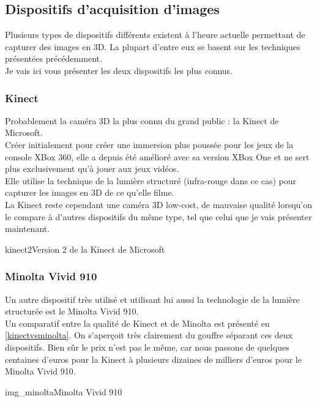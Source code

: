 \documentclass[poster]{polytech/polytech}
\begin{document}
\subsection{Dispositifs d'acquisition d'images}
\label{dispositif_acquisiton}
Plusieurs types de dispositifs différents existent à l'heure actuelle permettant de capturer des images en 3D. La plupart d'entre eux se basent sur les techniques présentées précédemment.\\
Je vais ici vous présenter les deux dispositifs les plus connus.

\subsubsection{Kinect}
\label{kinect}
Probablement la caméra 3D la plus connu du grand public : la Kinect de Microsoft.\\
Créer initialement pour créer une immersion plus poussée pour les jeux de la console XBox 360, elle a depuis été amélioré avec sa version XBox One et ne sert plus exclusivement qu'à jouer aux jeux vidéos.\\
Elle utilise la technique de la lumière structuré (infra-rouge dans ce cas) pour capturer les images en 3D de ce qu'elle filme.\\
La Kinect reste cependant une caméra 3D low-cost, de mauvaise qualité lorsqu'on le compare à d'autres dispositifs du même type, tel que celui que je vais présenter maintenant.

\begin{Figure}{kinect2}{Version 2 de la Kinect de Microsoft}
\end{Figure}

\subsubsection{Minolta Vivid 910}
\label{minolta}
Un autre dispositif très utilisé et utilisant lui aussi la technologie de la lumière structurée est le Minolta Vivid 910.\\
Un comparatif entre la qualité de Kinect et de Minolta est présenté en \autoref{kinectvsminolta}. On s'aperçoit très clairement du gouffre séparant ces deux dispositifs. Bien sûr le prix n'est pas le même, car nous passons de quelques centaines d'euros pour la Kinect à plusieurs dizaines de milliers d'euros pour le Minolta Vivid 910.

\begin{Figure}{img_minolta}{Minolta Vivid 910}
\end{Figure}
\end{document}
